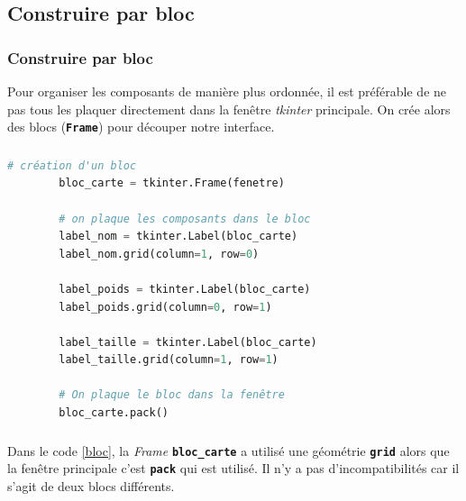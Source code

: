 \documentclass[svgnames,11pt]{beamer}
\begin{document}
\subsection{Construire par bloc}
\begin{frame}
    \frametitle{Construire par bloc}

    Pour organiser les composants de manière plus ordonnée, il est préférable de ne pas tous les plaquer directement dans la fenêtre \emph{tkinter} principale. On crée alors des blocs (\textbf{\texttt{Frame}}) pour découper notre interface.


\end{frame}
\begin{frame}[fragile]
    \frametitle{}

    \begin{center}
        \begin{lstlisting}[language=Python, basicstyle=\small]
        # création d'un bloc
        bloc_carte = tkinter.Frame(fenetre)
        
        # on plaque les composants dans le bloc
        label_nom = tkinter.Label(bloc_carte)
        label_nom.grid(column=1, row=0)
        
        label_poids = tkinter.Label(bloc_carte)
        label_poids.grid(column=0, row=1)
        
        label_taille = tkinter.Label(bloc_carte)
        label_taille.grid(column=1, row=1)
        
        # On plaque le bloc dans la fenêtre
        bloc_carte.pack()
        \end{lstlisting}
        \label{bloc}
    \end{center}

\end{frame}
\begin{frame}
    \frametitle{}

    \begin{aretenir}[Remarque]
        Dans le code \ref{bloc}, la \emph{Frame} \textbf{\texttt{bloc\_carte}} a utilisé une géométrie \textbf{\texttt{grid}} alors que la fenêtre principale c'est \textbf{\texttt{pack}} qui est utilisé. Il n'y a pas d'incompatibilités car il s'agit de deux blocs différents.
    \end{aretenir}

\end{frame}
\end{document}
